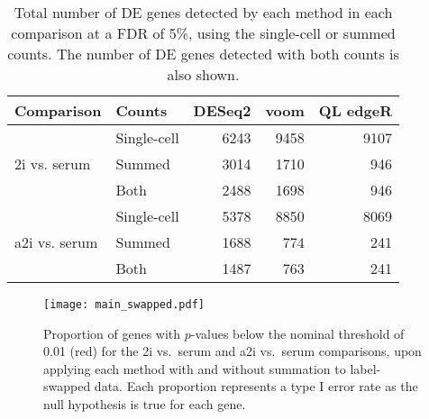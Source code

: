 \documentclass[oupdraft]{bio}
\begin{document}
\begin{table}[!p]
\caption{Total number of DE genes detected by each method in each comparison at a FDR of 5\%, using the single-cell or summed counts.
The number of DE genes detected with both counts is also shown.
}
\label{tab:realnum}
\begin{center}
\begin{tabular}{l l r r r}
\hline
\textbf{Comparison} & \textbf{Counts} & \textbf{DESeq2} & \textbf{voom} & \textbf{QL edgeR} \\
\hline
\multirow{3}{*}{2i vs. serum} 
& Single-cell & 6243 & 9458 & 9107 \\
& Summed & 3014 & 1710 & 946 \\
& Both & 2488 & 1698 & 946 \\
\hline
\multirow{3}{*}{a2i vs. serum} 
& Single-cell & 5378 & 8850 & 8069 \\
& Summed & 1688 & 774 & 241 \\
& Both & 1487 & 763 & 241 \\
\hline
\end{tabular}
\end{center}
\end{table}

\begin{figure}[!p]
\begin{center}
    \texttt{[image: main\_swapped.pdf]}
\end{center}
\caption{
    Proportion of genes with $p$-values below the nominal threshold of 0.01 (red) for the 2i vs.\ serum and a2i vs.\ serum comparisons, upon applying each method with and without summation to label-swapped data.
    Each proportion represents a type I error rate as the null hypothesis is true for each gene.
}
\label{fig:realswap}
\end{figure}
\end{document}
